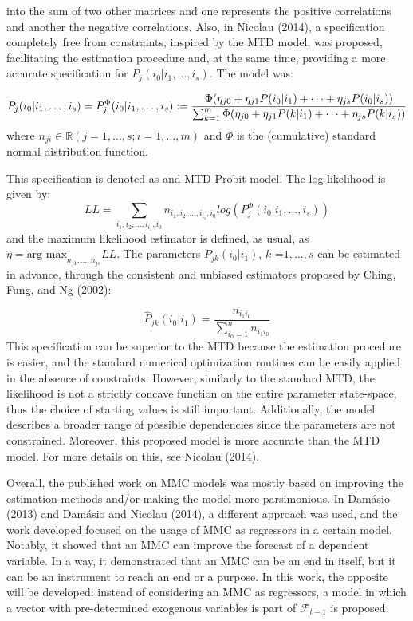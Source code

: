 into the sum of two other matrices and one represents the positive correlations and another the negative correlations. Also, in Nicolau (2014), a specification completely free from constraints, inspired by the MTD model, was proposed, facilitating the estimation procedure and, at the same time, providing a more accurate specification for \(P_j(i_0 | i_1, \dots, i_s)\). The model was:

\begin{equation}
P_j(i_0 | i_1, \dots, i_s) = P_j^{\Phi}(i_0 | i_1, \dots, i_s) :=
\\
 \frac{\Phi(\eta_{j0} + \eta_{j1}P(i_0|i_1) + \dots + \eta_{js}P(i_0|i_s))}{\sum_{k=1}^m \Phi(\eta_{j0} + \eta_{j1}P(k|i_1) + \dots + \eta_{js}P(k|i_s))}
 \label{eq:eq4}
\end{equation} where \(n_{ji} \in \mathbb{R}(j = 1, \dots, s; i = 1, \dots, m)\) and \(\Phi\) is the (cumulative) standard normal distribution function.

This specification is denoted as and MTD-Probit model. The log-likelihood is given by: \begin{equation}
LL = \sum_{i_1, i_2, \dots, i_{i_s}, i_0} n_{i_1, i_2, \dots, i_{i_s}, i_0} log(P_j^{\Phi}(i_0 | i_1, \dots, i_s) ) \label{eq:eq5}
\end{equation} and the maximum likelihood estimator is defined, as usual, as \(\widehat{\eta} = \text{arg max}_{n_{j1}, \dots, n_{js}} LL\). The parameters \(P_{jk}(i_0|i_1)\), \(k\) =\(1, \dots, s\) can be estimated in advance, through the consistent and unbiased estimators proposed by Ching, Fung, and Ng (2002):

\begin{equation}
\widehat{P}_{jk}(i_0|i_1) = \frac{n_{i_1i_0}}{\sum_{i_0=1}^n n_{i_1 i_0}} \label{eq:eq6}
\end{equation} This specification can be superior to the MTD because the estimation procedure is easier, and the standard numerical optimization routines can be easily applied in the absence of constraints. However, similarly to the standard MTD, the likelihood is not a strictly concave function on the entire parameter state-space, thus the choice of starting values is still important. Additionally, the model describes a broader range of possible dependencies since the parameters are not constrained. Moreover, this proposed model is more accurate than the MTD model. For more details on this, see Nicolau (2014).

Overall, the published work on MMC models was mostly based on improving the estimation methods and/or making the model more parsimonious. In Damásio (2013) and Damásio and Nicolau (2014), a different approach was used, and the work developed focused on the usage of MMC as regressors in a certain model. Notably, it showed that an MMC can improve the forecast of a dependent variable. In a way, it demonstrated that an MMC can be an end in itself, but it can be an instrument to reach an end or a purpose. In this work, the opposite will be developed: instead of considering an MMC as regressors, a model in which a vector with pre-determined exogenous variables is part of \(\mathcal{F}_{t-1}\) is proposed.

